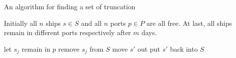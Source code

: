 \documentclass[12pt,letterpaper]{article}
\begin{document}
\begin{algorithm}[h!]
\caption{An algorithm for finding a set of truncation}
\begin{algorithmic}[1]
\REQUIRE Initially all $n$ ships $s \in S$ and all $n$ ports $p \in P$ are all free.
\ENSURE At last, all ships remain in different ports respectively after $m$ days.

\medskip

	    \STATE let $s_j$ remain in $p$
	    \STATE remove $s_j$ from $S$
	        \STATE move $s'$ out
	        \STATE put $s'$ back into $S$
	        \ENDIF
	    \ENDIF
	\ENDFOR
\ENDFOR
\end{algorithmic}
\end{algorithm}
\end{document}
